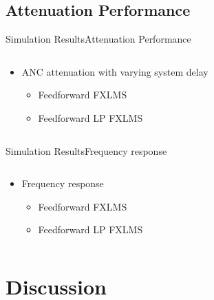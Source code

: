 \subsection{Attenuation Performance}
\begin{frame}{Simulation Results}{Attenuation Performance}		
\begin{columns}
	\begin{column}{0.4\textwidth}
	\begin{itemize}
		\item ANC attenuation with varying system delay
		\begin{itemize}
			\item Feedforward FXLMS 
			\item Feedforward LP FXLMS 
		\end{itemize}
	\end{itemize}
	\end{column}
	\begin{column}{0.6\textwidth} 
		\resizebox{0.9\columnwidth}{!}{		
			}
	\end{column}
\end{columns}
\end{frame}






\begin{frame}{Simulation Results}{Frequency response}		
\begin{columns}
	\begin{column}{0.4\textwidth}
		\begin{itemize}
			\item Frequency response
			\begin{itemize}
				\item Feedforward FXLMS 
				\item Feedforward LP FXLMS 
			\end{itemize}
		\end{itemize}
	\end{column}
	\begin{column}{0.6\textwidth} 
		\resizebox{0.9\columnwidth}{!}{		
			}
	\end{column}
\end{columns}
\end{frame}


\section{Discussion}
